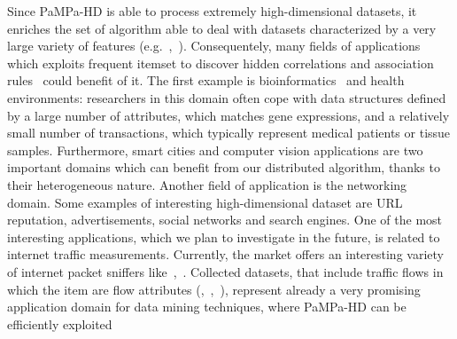 Since PaMPa-HD is able to process extremely
high-dimensional datasets, it enriches the set of algorithm
able to deal with datasets characterized by a very large variety of features (e.g.~\cite{Vimieiro20141},~\cite{Bermejo201235}).
Consequentely, many fields of applications which exploits frequent itemset to discover hidden correlations and association rules~\cite{KamsuFoguem20131034}
 could benefit of it.
The first example is bioinformatics~\cite{Nahar20131086} and health environments:
researchers in this domain often cope with data structures
defined by a large number of attributes,
which matches gene expressions,
and a relatively small number of transactions,
which typically represent medical patients or tissue samples.
Furthermore, smart cities and computer vision applications
are two important domains which can benefit
from our distributed algorithm,
thanks to their heterogeneous nature.
Another field of application is the networking domain.
Some examples of interesting high-dimensional dataset are
URL reputation, advertisements, social networks and search engines.
One of the most interesting applications,
which we plan to investigate in the future,
is related to internet traffic measurements.
Currently, the market offers an interesting variety of internet packet sniffers
like~\cite{Tstat},~\cite{netflow}. Collected datasets, that include traffic flows in which the item are flow
attributes (\cite{ISPA13},~\cite{fontas_AR},~\cite{Netmine}), 
represent already a very promising application domain
for data mining techniques, where
PaMPa-HD can be efficiently exploited 
